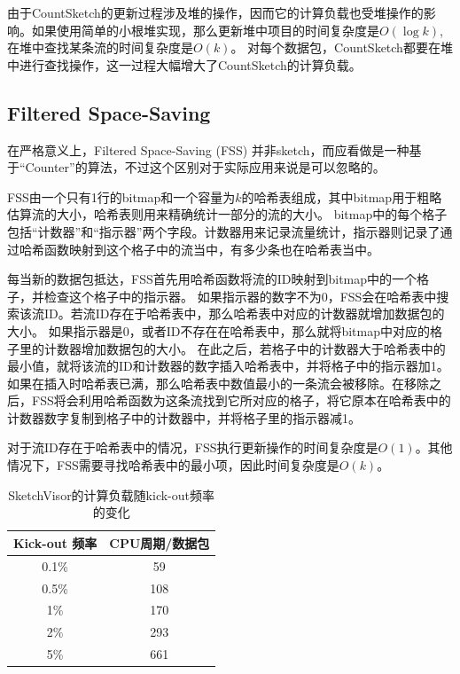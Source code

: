 由于CountSketch的更新过程涉及堆的操作，因而它的计算负载也受堆操作的影响。如果使用简单的小根堆实现，那么更新堆中项目的时间复杂度是$O(\log{k})$, 在堆中查找某条流的时间复杂度是$O(k)$。
对每个数据包，CountSketch都要在堆中进行查找操作，这一过程大幅增大了CountSketch的计算负载。



\subsection{Filtered Space-Saving \cite{homem2010finding}}\label{sec:FSS}
在严格意义上，Filtered Space-Saving (FSS) \cite{homem2010finding}并非sketch，而应看做是一种基于“Counter”的算法，不过这个区别对于实际应用来说是可以忽略的。

FSS由一个只有1行的bitmap和一个容量为$k$的哈希表组成，其中bitmap用于粗略估算流的大小，哈希表则用来精确统计一部分的流的大小。
bitmap中的每个格子包括“计数器”和“指示器”两个字段。计数器用来记录流量统计，指示器则记录了通过哈希函数映射到这个格子中的流当中，有多少条也在哈希表当中。

每当新的数据包抵达，FSS首先用哈希函数将流的ID映射到bitmap中的一个格子，并检查这个格子中的指示器。
如果指示器的数字不为0，FSS会在哈希表中搜索该流ID。若流ID存在于哈希表中，那么哈希表中对应的计数器就增加数据包的大小。
如果指示器是0，或者ID不存在在哈希表中，那么就将bitmap中对应的格子里的计数器增加数据包的大小。
在此之后，若格子中的计数器大于哈希表中的最小值，就将该流的ID和计数器的数字插入哈希表中，并将格子中的指示器加1。
如果在插入时哈希表已满，那么哈希表中数值最小的一条流会被移除。在移除之后，FSS将会利用哈希函数为这条流找到它所对应的格子，将它原本在哈希表中的计数器数字复制到格子中的计数器中，并将格子里的指示器减1。

对于流ID存在于哈希表中的情况，FSS执行更新操作的时间复杂度是$O(1)$。其他情况下，FSS需要寻找哈希表中的最小项，因此时间复杂度是$O(k)$。

\begin{table}[h]
	\centering
	\caption{SketchVisor的计算负载随kick-out频率的变化}\label{tbl:sketchvisor}
	\begin{tabular}{c|c}
		\hline
		Kick-out 频率 & CPU周期/数据包 \\
		\hline
		0.1\% & 59 \\
		\hline
		0.5\% & 108 \\
		\hline
		1\% & 170 \\
		\hline
		2\% & 293 \\
		\hline
		5\% & 661 \\
		\hline
	\end{tabular}
\end{table}


